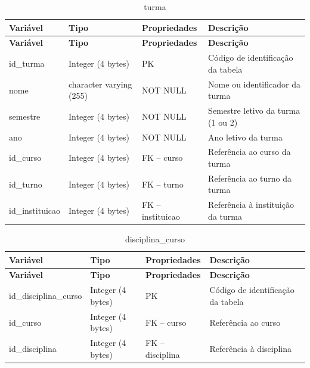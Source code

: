 \Needspace{0.32\textheight}
\begin{longtable}{|L{5.2cm}|L{3.2cm}|L{2.4cm}|L{3.4cm}|}
\caption{turma} \\
\hline
\textbf{Variável} & \textbf{Tipo} & \textbf{Propriedades} & \textbf{Descrição} \\
\hline
\endfirsthead
\hline
\textbf{Variável} & \textbf{Tipo} & \textbf{Propriedades} & \textbf{Descrição} \\
\hline
\endhead
id\_turma & Integer (4 bytes) & PK & Código de identificação da tabela \\
\hline
nome & character varying (255) & NOT NULL & Nome ou identificador da turma \\
\hline
semestre & Integer (4 bytes) & NOT NULL & Semestre letivo da turma (1 ou 2) \\
\hline
ano & Integer (4 bytes) & NOT NULL & Ano letivo da turma \\
\hline
id\_curso & Integer (4 bytes) & FK – curso & Referência ao curso da turma \\
\hline
id\_turno & Integer (4 bytes) & FK – turno & Referência ao turno da turma \\
\hline
id\_instituicao & Integer (4 bytes) & FK – instituicao & Referência à instituição da turma \\
\hline
\end{longtable}

\fonteautores

\vspace{\baselineskip}

\Needspace{0.32\textheight}
\begin{longtable}{|L{5.2cm}|L{3.2cm}|L{2.4cm}|L{3.4cm}|}
\caption{disciplina\_curso} \\
\hline
\textbf{Variável} & \textbf{Tipo} & \textbf{Propriedades} & \textbf{Descrição} \\
\hline
\endfirsthead
\hline
\textbf{Variável} & \textbf{Tipo} & \textbf{Propriedades} & \textbf{Descrição} \\
\hline
\endhead
id\_disciplina\_curso & Integer (4 bytes) & PK & Código de identificação da tabela \\
\hline
id\_curso & Integer (4 bytes) & FK – curso & Referência ao curso \\
\hline
id\_disciplina & Integer (4 bytes) & FK – disciplina & Referência à disciplina \\
\hline
\end{longtable}

\fonteautores


